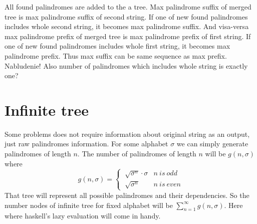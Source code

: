 All found palindromes are added to the a tree. Max palindrome suffix of merged tree is max palindrome suffix of second string. If one of new found palindromes includes whole second string, it becomes max palindrome suffix. And visa-versa max palindrome prefix of merged tree is max palindrome prefix of first string. If one of new found palindromes includes whole first string, it becomes max palindrome prefix. Thus max suffix can be same sequence as max prefix. Nabludenie! Also number of palindromes which includes whole string is exactly one?
\section{Infinite tree}
Some problems does not require information about original string as an output, just raw palindromes information. For some alphabet $\sigma$ we can simply generate palindromes of length $n$. The number of palindromes of length $n$ will be $g(n, \sigma)$ where 
$$g(n, \sigma) = \begin{cases}
\ \sqrt{\sigma^{n}} \cdot \sigma & n \ is \ odd\\
\ \sqrt{\sigma^{n}}   & n \ is \ even
\end{cases}$$
 That tree will represent all possible palindromes and their dependencies. So the number nodes of infinite tree for fixed alphabet will be $\sum_{n=1}^{\infty} g(n, \sigma)$. Here where haskell's lazy evaluation will come in handy. 

